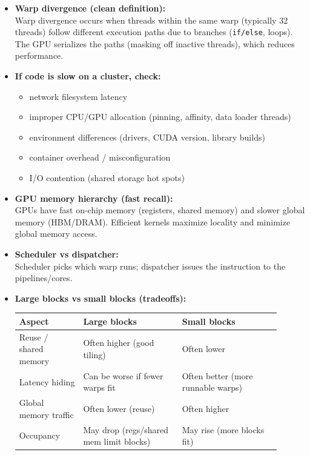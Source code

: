 \documentclass[11pt]{article}
\newcommand{\blue}[1]{\textcolor{myblue}{#1}}
\newcommand{\term}[1]{\textbf{\blue{#1}}}
\begin{document}
\begin{itemize}[leftmargin=1.2em]
    \item \term{Warp divergence (clean definition):}\\
    Warp divergence occurs when threads within the same warp (typically 32 threads) follow different execution paths due to branches (\texttt{if/else}, loops). The GPU serializes the paths (masking off inactive threads), which reduces performance.
    
    \item \term{If code is slow on a cluster, check:}
    \begin{itemize}
    \item network filesystem latency
    \item improper CPU/GPU allocation (pinning, affinity, data loader threads)
    \item environment differences (drivers, CUDA version, library builds)
    \item container overhead / misconfiguration
    \item I/O contention (shared storage hot spots)
    \end{itemize}
    
    \item \term{GPU memory hierarchy (fast recall):}\\
    GPUs have fast on-chip memory (registers, shared memory) and slower global memory (HBM/DRAM). Efficient kernels maximize locality and minimize global memory access.
    
    \item \term{Scheduler vs dispatcher:}\\
    Scheduler picks which warp runs; dispatcher issues the instruction to the pipelines/cores.
    
    \item \term{Large blocks vs small blocks (tradeoffs):}
    \begin{center}
    \renewcommand{\arraystretch}{1.15}
    \begin{tabular}{|p{0.22\linewidth}|p{0.34\linewidth}|p{0.34\linewidth}|}
    \hline
    \textbf{Aspect} & \textbf{Large blocks} & \textbf{Small blocks} \\
    \hline
    Reuse / shared memory & Often higher (good tiling) & Often lower \\
    \hline
    Latency hiding & Can be worse if fewer warps fit & Often better (more runnable warps) \\
    \hline
    Global memory traffic & Often lower (reuse) & Often higher \\
    \hline
    Occupancy & May drop (regs/shared mem limit blocks) & May rise (more blocks fit) \\
    \hline
    \end{tabular}
    \end{center}
    

\end{itemize}
\end{document}
